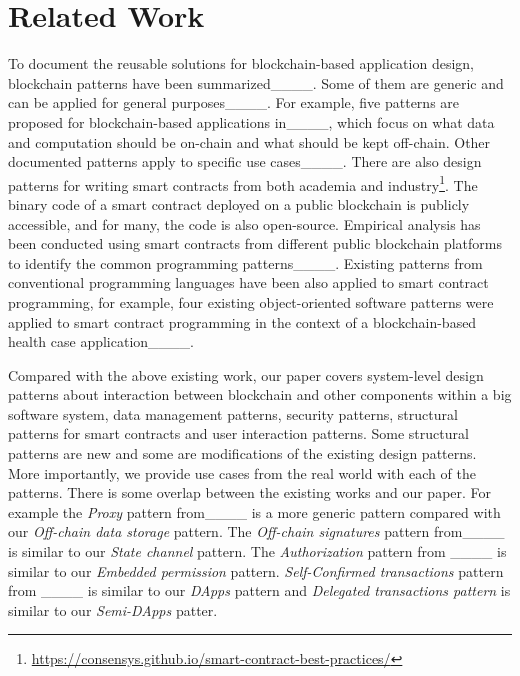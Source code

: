 \section{Related Work}
\label{sec:relatedwork}


To document the reusable solutions for blockchain-based application design, blockchain patterns have been summarized____.
Some of them are generic and can be applied for general purposes____. For example, five patterns are proposed for blockchain-based applications in____, which focus on what data and computation should be on-chain and what should be kept off-chain. Other documented patterns apply to specific use cases____. 
There are also design patterns for writing smart contracts from both academia and industry\footnote{\url{https://consensys.github.io/smart-contract-best-practices/}}. The binary code of a smart contract deployed on a public blockchain is publicly accessible, and for many, the code is also open-source. Empirical analysis has been conducted using smart contracts from different public blockchain platforms to identify the common programming patterns____. Existing patterns from conventional programming languages have been also applied to smart contract programming, for example, four existing object-oriented software patterns were applied to smart contract programming in the context of a blockchain-based health case application____.
 
Compared with the above existing work, our paper covers system-level design patterns about interaction between blockchain and other components within a big software system, data management patterns, security patterns, structural patterns for smart contracts and user interaction patterns. Some structural patterns are new and some are modifications of the existing design patterns. More importantly, we provide use cases from the real world with each of the patterns. There is some overlap between the existing works and our paper. For example the \emph{Proxy} pattern from____ is a more generic pattern compared with our \emph{Off-chain data storage} pattern. The \emph{Off-chain signatures} pattern from____ is similar to our \emph{State channel} pattern. The \emph{Authorization} pattern from ____ is similar to our \emph{Embedded permission} pattern. \emph{Self-Confirmed transactions} pattern from ____ is similar to our \emph{DApps} pattern and \emph{Delegated transactions pattern} is similar to our \emph{Semi-DApps} patter. 

